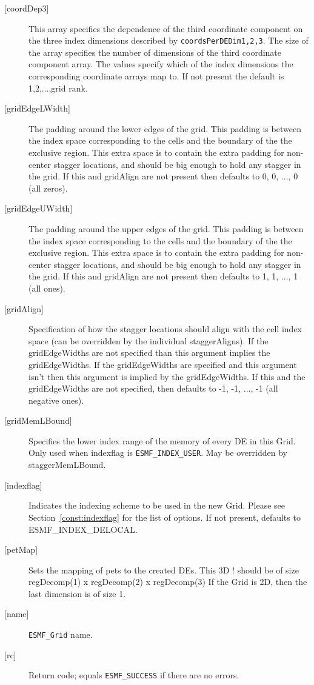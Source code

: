 \begin{description}
   \item[{[coordDep3]}]
       This array specifies the dependence of the third
       coordinate component on the three index dimensions
       described by {\tt coordsPerDEDim1,2,3}. The size of the
       array specifies the number of dimensions of the third
       coordinate component array. The values specify which
       of the index dimensions the corresponding coordinate
       arrays map to. If not present the default is 1,2,...,grid rank.
   \item[{[gridEdgeLWidth]}]
        The padding around the lower edges of the grid. This padding is between
        the index space corresponding to the cells and the boundary of the
        the exclusive region. This extra space is to contain the extra
        padding for non-center stagger locations, and should be big enough
        to hold any stagger in the grid. If this and gridAlign are not present then
        defaults to 0, 0, ..., 0 (all zeros).
   \item[{[gridEdgeUWidth]}]
        The padding around the upper edges of the grid. This padding is between
        the index space corresponding to the cells and the boundary of the
        the exclusive region. This extra space is to contain the extra
        padding for non-center stagger locations, and should be big enough
        to hold any stagger in the grid. If this and gridAlign are not present then
        defaults to 1, 1, ..., 1 (all ones).
   \item[{[gridAlign]}]
       Specification of how the stagger locations should align with the cell
       index space (can be overridden by the individual staggerAligns). If
       the gridEdgeWidths are not specified than this argument
       implies the gridEdgeWidths. If the gridEdgeWidths are specified and this argument isn't
       then this argument is implied by the gridEdgeWidths.
       If this and the gridEdgeWidths are not specified, then defaults to
      -1, -1, ..., -1 (all negative ones).
   \item[{[gridMemLBound]}]
        Specifies the lower index range of the memory of every DE in this Grid.
        Only used when indexflag is {\tt ESMF\_INDEX\_USER}. May be overridden
        by staggerMemLBound.
   \item[{[indexflag]}]
        Indicates the indexing scheme to be used in the new Grid. Please see
        Section~\ref{const:indexflag} for the list of options. If not present,
        defaults to ESMF\_INDEX\_DELOCAL.
   \item[{[petMap]}]
         Sets the mapping of pets to the created DEs. This 3D
  !       should be of size regDecomp(1) x regDecomp(2) x regDecomp(3)
         If the Grid is 2D, then the last dimension is of size 1.
   \item[{[name]}]
        {\tt ESMF\_Grid} name.
   \item[{[rc]}]
        Return code; equals {\tt ESMF\_SUCCESS} if there are no errors.
   \end{description}
   
